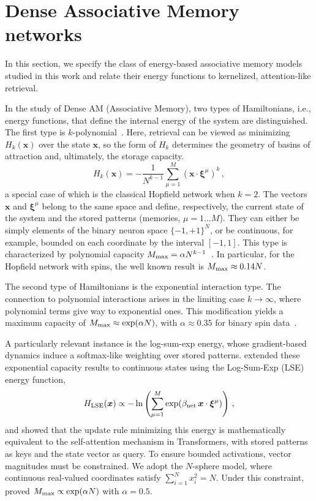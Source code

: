 \documentclass{article}
\theoremstyle{plain}
\theoremstyle{definition}
\theoremstyle{remark}
\begin{document}
\section{Dense Associative Memory networks}\label{sec:dam}

In this section, we specify the class of energy-based associative memory models studied in this work and relate their energy functions to kernelized, attention-like retrieval.

In the study of Dense AM (Associative Memory), two types of Hamiltonians, i.e., energy functions, that define the internal energy of the system are distinguished.  The first type is $k$-polynomial~\cite{krotov2016dense}. Here, retrieval can be viewed as minimizing $H_k(\bm{x})$ over the state $\bm{x}$, so the form of $H_k$ determines the geometry of basins of attraction and, ultimately, the storage capacity.
\begin{equation}
    H_k(\bm{x}) = - \frac{1}{N^{k-1}} \sum\limits_{\mu=1}^{M} (\bm{x} \cdot \bm{\xi}^\mu)^k\,,
    \label{eq:H_k}
\end{equation}
a special case of which is the classical Hopfield network \cite{Hopfield1982} when $k=2$. 
The vectors $\bm{x}$ and $\bm{\xi}^\mu$ belong to the same space and define, respectively, the current state of the system and the stored patterns (memories, $\mu=1\dots M$). They can either be simply elements of the binary neuron space $\{-1,+1\}^N$, or be continuous, for example, bounded on each coordinate by the interval $[-1, 1]$. This type is characterized by polynomial capacity $M_{\rm max} = \alpha N^{k-1}$~\cite{krotov2016dense}. In particular, for the Hopfield network with spins, the well known result is $M_{\rm max} \approx 0.14N$.

The second type of Hamiltonians is the exponential interaction type. The connection to polynomial interactions arises in the limiting case $k \to \infty$, where polynomial terms give way to exponential ones. This modification yields a maximum capacity of $M_{\rm max} \approx \exp(\alpha N)$, with $\alpha \approx 0.35$ for binary spin data~\cite{demircigil2017model}.

A particularly relevant instance is the log-sum-exp energy, whose gradient-based dynamics induce a softmax-like weighting over stored patterns.
\citet{ramsauer2021hopfield} extended these exponential capacity results to continuous states using the Log-Sum-Exp (LSE) energy function,
\begin{equation}
    H_{\rm LSE}(\bm{x}) \propto -\ln \left( \sum_{\mu=1}^M \exp(\beta_{\rm net} \, \bm{x} \cdot \bm{\xi}^\mu) \right) \,,
    \label{eq:lse_energy}
\end{equation}
and showed that the update rule minimizing this energy is mathematically equivalent to the self-attention mechanism in Transformers, with stored patterns as keys and the state vector as query. To ensure bounded activations, vector magnitudes must be constrained. We adopt the $N$-sphere model, where continuous real-valued coordinates satisfy $\sum_{i=1}^{N} x_i^2 = N$. Under this constraint, \citet{ramsauer2021hopfield} proved $M_{\rm max} \propto \exp(\alpha N)$ with $\alpha = 0.5$.
\end{document}
